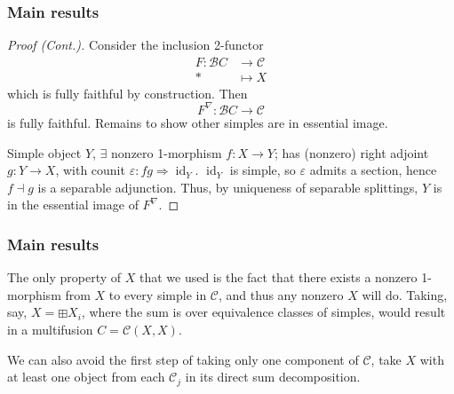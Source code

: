 \documentclass{beamer}
\newcommand{\veps}{{\varepsilon}}
\DeclareMathOperator{\id}{id}
\newcommand{\cB}{{\mathcal{B}}}
\newcommand{\cC}{{\mathcal{C}}}
\begin{document}
\begin{frame}
\frametitle{Main results}

\begin{proof}[Proof (Cont.)]

Consider the inclusion 2-functor
\begin{align*}
F : \cB C &\to \cC
\\
* &\mapsto X
\end{align*}
which is fully faithful by construction.
\pause
Then
\[
F^\nabla: \cB C \to \cC
\]
is fully faithful.
\pause
Remains to show other simples are in essential image.

\pause
Simple object $Y$,
\pause
$\exists$ nonzero 1-morphism $f: X \to Y$;
\pause
has (nonzero) right adjoint $g: Y \to X$,
with counit $\veps : fg \Rightarrow \id_Y$.
\pause
$\id_Y$ is simple, so $\veps$ admits a section,
\pause
hence $f \dashv g$ is a separable adjunction.
\pause
Thus, by uniqueness of separable splittings,
$Y$ is in the essential image of $F^\nabla$.
\end{proof}

\end{frame}

\begin{frame}
\frametitle{Main results}


The only property of $X$ that we used is the fact that
there exists a nonzero 1-morphism from $X$ to every simple
in $\cC$,
and thus any nonzero $X$ will do.
\pause
Taking, say, $X = \boxplus X_i$,
where the sum is over equivalence classes of simples,
would result in a multifusion $C = \cC(X,X)$.

\pause
We can also avoid the first step of taking only one component
of $\cC$,
take $X$ with at least one object from each $\cC_j$
in its direct sum decomposition.

\end{frame}
\end{document}
